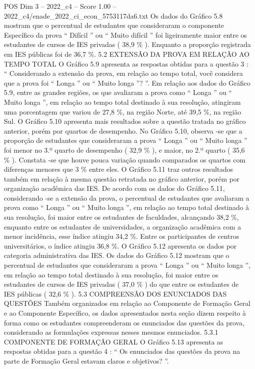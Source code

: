 \begin{textsample}{POS Dim 3 – 2022\_c4 – Score 1.00 – 2022\_c4/enade\_2022\_ci\_econ\_5753117da6.txt}
Os dados do Gráfico 5.8 mostram que o percentual de estudantes que consideraram o componente Específico da prova “ Difícil ” ou “ Muito difícil ” foi ligeiramente maior entre os estudantes de cursos de IES privadas ( 38,9 \% ).
Enquanto a proporção registrada em IES públicas foi de 36,7 \%. 5.2 EXTENSÃO DA PROVA EM RELAÇÃO AO TEMPO TOTAL O Gráfico 5.9 apresenta as respostas obtidas para a questão 3 : “ Considerando a extensão da prova, em relação ao tempo total, você considera que a prova foi “ Longa ” ou “ Muito longa ”? ”.
Em relação aos dados do Gráfico 5.9, entre as grandes regiões, os que avaliaram a prova como “ Longa ” ou “ Muito longa ”, em relação ao tempo total destinado à sua resolução, atingiram uma porcentagem que variou de 27,8 \%, na região Norte, até 39,5 \%, na região Sul.
O Gráfico 5.10 apresenta mais resultados sobre a questão tratada no gráfico anterior, porém por quartos de desempenho.
No Gráfico 5.10, observa -se que a proporção de estudantes que consideraram a prova “ Longa ” ou “ Muito longa ” foi menor no 3.º quarto de desempenho ( 32,9 \% ), e maior, no 2.º quarto ( 35,6 \% ).
Constata -se que houve pouca variação quando comparados os quartos com diferenças menores que 3 \% entre eles.
O Gráfico 5.11 traz outros resultados também em relação à mesma questão retratada no gráfico anterior, porém por organização acadêmica das IES.
De acordo com os dados do Gráfico 5.11, considerando -se a extensão da prova, o percentual de estudantes que avaliaram a prova como “ Longa ” ou “ Muito longa ”, em relação ao tempo total destinado à sua resolução, foi maior entre os estudantes de faculdades, alcançando 38,2 \%, enquanto entre os estudantes de universidades, a organização acadêmica com a menor incidência, esse índice atingiu 34,2 \%.
Entre os participantes de centros universitários, o índice atingiu 36,8 \%.
O Gráfico 5.12 apresenta os dados por categoria administrativa das IES.
Os dados do Gráfico 5.12 mostram que o percentual de estudantes que consideraram a prova “ Longa ” ou “ Muito longa ”, em relação ao tempo total destinado à sua resolução, foi maior entre os estudantes de cursos de IES privadas ( 37,0 \% ) do que entre os estudantes de IES públicas ( 32,6 \% ). 5.3 COMPREENSÃO DOS ENUNCIADOS DAS QUESTÕES Também organizados em relação ao Componente de Formação Geral e ao Componente Específico, os dados apresentados nesta seção dizem respeito à forma como os estudantes compreenderam os enunciados das questões da prova, considerando as formulações expressas nesses mesmos enunciados. 5.3.1 COMPONENTE DE FORMAÇÃO GERAL O Gráfico 5.13 apresenta as respostas obtidas para a questão 4 : “ Os enunciados das questões da prova na parte de Formação Geral estavam claros e objetivos? ”.

\end{textsample}
